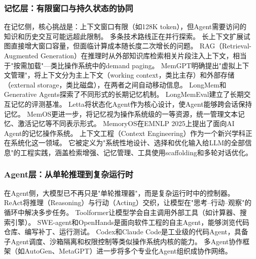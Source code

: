 \subsubsection{记忆层：有限窗口与持久状态的协同}

在记忆侧，核心挑战是：上下文窗口有限（如128K token），但Agent需要访问的知识和历史交互可能远超此限制。
多条技术路线正在并行探索。
长上下文扩展\cite{gemini2024,yarn2024}试图直接增大窗口容量，但面临计算成本随长度二次增长的问题。
RAG（Retrieval-Augmented Generation）\cite{lewis2020rag}在推理时从外部知识库检索相关片段注入上下文，相当于"按需加载"---类比操作系统中的demand paging。
MemGPT\cite{memgpt2023}明确提出"虚拟上下文管理"，将上下文分为主上下文（working context，类比主存）和外部存储（external storage，类比磁盘），在两者之间自动移动信息。
LongMem\cite{longmem2023}和Generative Agents\cite{park2023generativeagents}探索了不同形式的长期记忆机制。
LongMemEval\cite{longmemeval2024}建立了长期交互记忆的评测基准。
Letta\cite{letta_stateful_2026}将状态化Agent作为核心设计，使Agent能够跨会话保持记忆。
MemOS\cite{memos2025}更进一步，将记忆视为操作系统级的一等资源，统一管理文本记忆、激活记忆等不同表示形式。
MemoryOS\cite{memoryos2025}在EMNLP 2025上提出了面向AI Agent的记忆操作系统。
上下文工程（Context Engineering）\cite{contextengineer_survey2025}作为一个新兴学科正在系统化这一领域。
它被定义为"系统性地设计、选择和优化输入给LLM的全部信息"的工程实践，涵盖检索增强、记忆管理、工具使用scaffolding和多轮对话优化。

\subsubsection{Agent层：从单轮推理到复杂运行时}

在Agent侧，大模型已不再只是"单轮推理器"，而是复杂运行时中的控制器。
ReAct\cite{yao2023react}将推理（Reasoning）与行动（Acting）交织，让模型在"思考--行动--观察"的循环中解决多步任务。
Toolformer\cite{schick2023toolformer}让模型学会自主调用外部工具（如计算器、搜索引擎）。
SWE-agent\cite{sweagent2024}和OpenHands\cite{openhands_paper_2025}是面向软件工程的自主Agent，能够浏览代码仓库、编写补丁、运行测试。
Codex\cite{openai_codex_overview_2026}和Claude Code\cite{anthropic_claudecode_overview_2026}是工业级的代码Agent，具备子Agent调度\cite{anthropic_claudecode_subagents_2026}、沙箱隔离\cite{openai_codex_sandbox_2026,anthropic_claudecode_sandbox_2026}和权限控制\cite{openai_codex_approvals_2026,anthropic_claudecode_security_2026}等类似操作系统内核的能力。
多Agent协作框架（如AutoGen\cite{wu2023autogen}、MetaGPT\cite{metagpt2023}）进一步将多个专业化Agent组织成协作网络。


